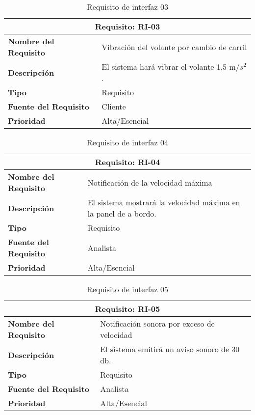 \begin{table}[H]
\begin{center}
\begin{tabular}{p{} p{7cm}}
\multicolumn{2}{c}{\textbf{Requisito: RI-03} } \\
\hline \hline
\textbf{Nombre del Requisito} & Vibración del volante por cambio de carril\\
\hline
\textbf{Descripción} & El sistema hará vibrar el volante 1,5 m/$s^2$. \\
\hline
\textbf{Tipo} & Requisito  \\
\hline
\textbf{Fuente del Requisito} & Cliente \\
\hline
\textbf{Prioridad} & Alta/Esencial  \\ \hline
\end{tabular}
\caption{Requisito de interfaz 03}
\label{tab:RI-03}
\end{center}
\end{table}

\begin{table}[H]
\begin{center}
\begin{tabular}{p{} p{7cm}}
\multicolumn{2}{c}{\textbf{Requisito: RI-04} } \\
\hline \hline
\textbf{Nombre del Requisito} & Notificación de la velocidad máxima\\
\hline
\textbf{Descripción} & El sistema mostrará la velocidad máxima en la panel de a bordo.\\
\hline
\textbf{Tipo} & Requisito  \\
\hline
\textbf{Fuente del Requisito} & Analista \\
\hline
\textbf{Prioridad} & Alta/Esencial  \\ \hline
\end{tabular}
\caption{Requisito de interfaz 04}
\label{tab:RI-04}
\end{center}
\end{table}

\begin{table}[H]
\begin{center}
\begin{tabular}{p{} p{7cm}}
\multicolumn{2}{c}{\textbf{Requisito: RI-05} } \\
\hline \hline
\textbf{Nombre del Requisito} & Notificación sonora por exceso de velocidad\\
\hline
\textbf{Descripción} & El sistema emitirá un aviso sonoro de 30 db. \\
\hline
\textbf{Tipo} & Requisito  \\
\hline
\textbf{Fuente del Requisito} & Analista \\
\hline
\textbf{Prioridad} & Alta/Esencial  \\ \hline
\end{tabular}
\caption{Requisito de interfaz 05}
\label{tab:RI-05}
\end{center}
\end{table}

